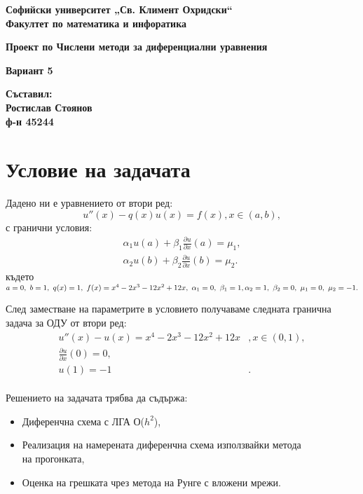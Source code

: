 \documentclass[11pt,a4paper]{article}
\begin{document}
\linespread{1.25}
\begin{titlepage}
   \begin{center}
       \vspace*{1cm}

\LARGE
       \textbf{Софийски университет „Св. Климент Охридски“\\
       Факултет по математика и инфоратика\\}

\addvspace{110pt}

	\Huge
       \textbf{Проект по Числени методи за диференциални уравнения}

 \vspace{0.5cm}
	\LARGE
        \textbf{Вариант 5}


       \vspace{1.5cm}
   \end{center}
    \vfill
\Large
       \textbf{Съставил:\\Ростислав Стоянов\\ф-н 45244}
 
    
 
 
       \vspace{0.8cm}
 
\end{titlepage}



\large
\tableofcontents
\pagebreak

\section{Условие на задачата}

Дадено ни е уравнението от втори ред:
$$ u''(x) -q(x)u(x) = f(x), x\in (a,b), $$
с гранични условия:
\begin{align*}
 \alpha_1u(a) + \beta_1\frac{\partial u}{\partial x}(a) = \mu_1, \\
\alpha_2u(b) + \beta_2\frac{\partial u}{\partial x}(b) = \mu_2.
\end{align*}
където $ a = 0,\  b = 1,\  q(x) = 1,\  f(x) = x^4 - 2x^3 -12x^2 +12x,\ \alpha_1 = 0,\ \beta_1 = 1,\\ \alpha_2 = 1,\ \beta_2 = 0,\ \mu_1 = 0 ,\ \mu_2 = -1.$

След заместване на параметрите в условието получаваме следната гранична задача за ОДУ от втори ред:
\begin{align}
 u''(x) - u(x) =x^4 - 2x^3 - 12x^2 + 12x&, x\in (0,1),\\
\frac{\partial u}{\partial x}(0) = 0,&\\ 
u(1) = -1&.
\end{align}
\\
Решението на задачата трябва да съдържа: 
\begin{itemize}
\item{ Диференчна схема с ЛГА О($h^2$),}
\item { Реализация на намерената диференчна схема използвайки метода\\ на прогонката,}
\item { Оценка на грешката чрез метода на Рунге с вложени мрежи.}
\end{itemize}
\end{document}
